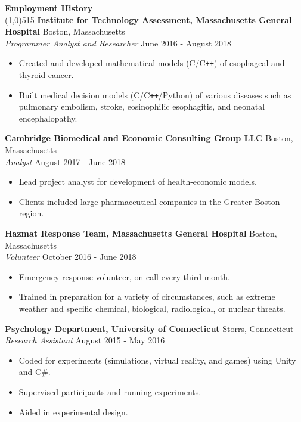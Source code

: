 \documentclass{article}
\newcommand{\s}[1]{\vspace{4mm} \noindent \large \textbf{#1} \\[-2.5mm] \linethickness{0.2mm} \line(1,0){515}}
\newcommand{\n}{\\ \noindent \normalsize}
\newcommand{\nl}{\noindent \normalsize}
\begin{document}
	\vspace{-3.5mm}	

\s{Employment History}
	\vspace{2.0mm}
	\nl \textbf{Institute for Technology Assessment, Massachusetts General Hospital} \hfill Boston, Massachusetts
	\n \textit{Programmer Analyst and Researcher} \hfill June 2016 - August 2018
	\begin{itemize}
		\item Created and developed mathematical models (C/C\texttt{++}) of esophageal and thyroid cancer. 
		\vspace{-2.5mm} \item Built medical decision models (C/C\texttt{++}/Python) of various diseases such as pulmonary embolism, stroke, eosinophilic esophagitis, and neonatal encephalopathy.
	\end{itemize}

	\nl \textbf{Cambridge Biomedical and Economic Consulting Group LLC} \hfill Boston, Massachusetts
	\n \textit{Analyst} \hfill August 2017 - June 2018
	\begin{itemize}
		\item Lead project analyst for development of health-economic models. 
		\vspace{-2.5mm} \item Clients included large pharmaceutical companies in the Greater Boston region. 
	\end{itemize}

	\nl \textbf{Hazmat Response Team, Massachusetts General Hospital} \hfill Boston, Massachusetts
	\n \textit{Volunteer} \hfill October 2016 - June 2018
	\begin{itemize}
		\item Emergency response volunteer, on call every third month.
		\vspace{-2.5mm} \item Trained in preparation for a variety of circumstances, such as extreme weather and specific chemical, biological, radiological, or nuclear threats.
	\end{itemize}

	\nl \textbf{Psychology Department, University of Connecticut} \hfill Storrs, Connecticut
	\n \textit{Research Assistant} \hfill August 2015 - May 2016
	\begin{itemize}
		\item Coded for experiments (simulations, virtual reality, and games) using Unity and C\#. 
		\vspace{-2.5mm} \item Supervised participants and running experiments. 	
		\vspace{-2.5mm} \item Aided in experimental design. 	
	\end{itemize}
	
\end{document}
